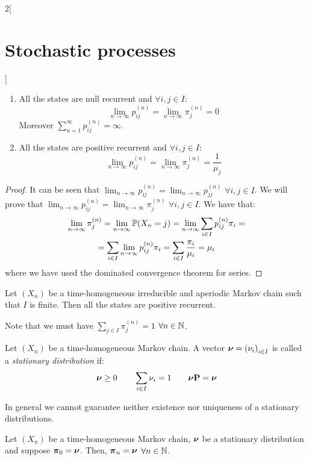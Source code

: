 \documentclass[../../../main_math.tex]{subfiles}
\begin{document}
\begin{multicols}{2}[\section{Stochastic processes}]
\begin{theorem}
\begin{enumerate}
      \item All the states are null recurrent and $\forall i,j\in I$: $$\lim_{n\to\infty} p_{ij}^{(n)}=\lim_{n\to\infty} \pi_j^{(n)}=0$$ Moreover $\sum_{n=1}^\infty p_{ij}^{(n)}=\infty$.
      \item All the states are positive recurrent and $\forall i,j\in I$: $$\lim_{n\to\infty} p_{ij}^{(n)}=\lim_{n\to\infty} \pi_j^{(n)}=\frac{1}{\mu_j}$$
    \end{enumerate}
  \end{theorem}
  \begin{proof}
    It can be seen that $\displaystyle\lim_{n\to\infty}p_{ij}^{(n)}=\lim_{n\to\infty} p_{jj}^{(n)}$ $\forall i, j\in I$. We will prove that $\displaystyle\lim_{n\to\infty}p_{ij}^{(n)}=\lim_{n\to\infty} \pi_j^{(n)}$ $\forall i, j\in I$. We have that:
    \begin{multline*}
      \lim_{n\to\infty}\pi_j^{(n)}=\lim_{n\to\infty}\mathbb{P}(X_n=j)=\lim_{n\to\infty}\sum_{i\in I}p_{ij}^{(n)}\pi_i=\\=\sum_{i\in I}\lim_{n\to\infty}p_{ij}^{(n)}\pi_i=\sum_{i\in I}\frac{\pi_i}{\mu_i}=\mu_i
    \end{multline*}
    where we have used the dominated convergence theorem for series.
  \end{proof}
  \begin{corollary}\label{SP:coroClassificationStates}
    Let $(X_n)$ be a time-homogeneous irreducible and aperiodic Markov chain such that $I$ is finite. Then all the states are positive recurrent.
  \end{corollary}
  \begin{sproof}
    Note that we must have $\sum_{j\in I}\pi_j^{(n)}=1$ $\forall n\in\mathbb{N}$.
  \end{sproof}
  \begin{definition}
    Let $(X_n)$ be a time-homogeneous Markov chain. A vector $\boldsymbol{\mathrm{\nu}}={(\nu_i)}_{i\in I}$ is called a \emph{stationary distribution} if:
    $$
      \boldsymbol{\mathrm{\nu}}\geq 0\qquad\sum_{i\in I}\nu_i=1\qquad\boldsymbol{\mathrm{\nu}}\boldsymbol{\mathrm{P}}=\boldsymbol{\mathrm{\nu}}
    $$
  \end{definition}
  \begin{remark}
    In general we cannot guarantee neither existence nor uniqueness of a stationary distributions.
  \end{remark}
  \begin{lemma}
    Let $(X_n)$ be a time-homogeneous Markov chain, $\boldsymbol{\mathrm{\nu}}$ be a stationary distribution and suppose $\boldsymbol{\mathrm{\pi}}_0=\boldsymbol{\mathrm{\nu}}$. Then, $\boldsymbol{\mathrm{\pi}}_n=\boldsymbol{\mathrm{\nu}}$ $\forall n\in\mathbb{N}$.
  \end{lemma}

\end{multicols}
\end{document}
